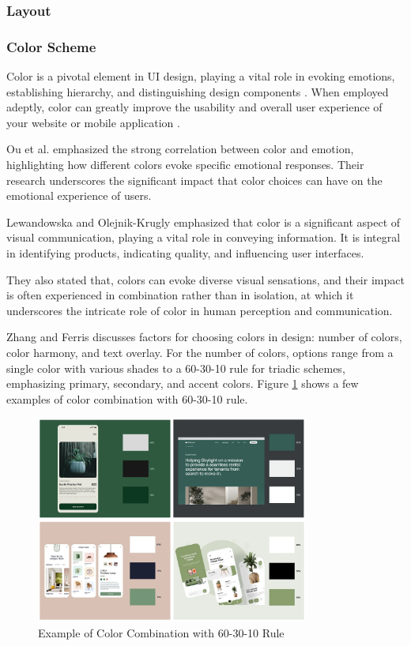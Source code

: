 \subsubsection{Layout}

\subsubsection{Color Scheme}

Color is a pivotal element in UI design, playing a vital role in evoking emotions, establishing hierarchy, and distinguishing design components \cite{M._2023}. When employed adeptly, color can greatly improve the usability and overall user experience of your website or mobile application \cite{M._2023}.

Ou et al. \cite{Ou04} emphasized the strong correlation between color and emotion, highlighting how different colors evoke specific emotional responses. Their research underscores the significant impact that color choices can have on the emotional experience of users.

Lewandowska and Olejnik-Krugly \cite{Lewandowska2021} emphasized that color is a significant aspect of visual communication, playing a vital role in conveying information. It is integral in identifying products, indicating quality, and influencing user interfaces.

They also stated that, colors can evoke diverse visual sensations, and their impact is often experienced in combination rather than in isolation, at which it underscores the intricate role of color in human perception and communication.

Zhang and Ferris \cite{Zhang16} discusses factors for choosing colors in design: number of colors, color harmony, and text overlay. For the number of colors, options range from a single color with various shades to a 60-30-10 rule for triadic schemes, emphasizing primary, secondary, and accent colors. Figure \ref{fig:color-scheme} shows a few examples of color combination with 60-30-10 rule.

\begin{figure}[!ht]
    \centering
    \includegraphics[width=0.8\textwidth]{texs/Part2/chapter3/image/colorexample.png}
    \caption{Example of Color Combination with 60-30-10 Rule \cite{M._2023}}
    \label{fig:color-scheme}
\end{figure}

